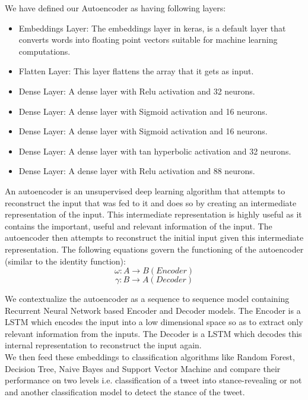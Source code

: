 \documentclass[a4paper,11pt]{article}
\begin{document}
We have defined our Autoencoder as having following layers:
\begin{itemize}
    \item Embeddings Layer: The embeddings layer in keras, is a default layer that converts words into floating point vectors suitable for machine learning computations.
    \item Flatten Layer: This layer flattens the array that it gets as input.
    \item Dense Layer: A dense layer with Relu activation and 32 neurons.
    \item Dense Layer: A dense layer with Sigmoid activation and 16 neurons.
    \item Dense Layer: A dense layer with Sigmoid activation and 16 neurons.
    \item Dense Layer: A dense layer with tan hyperbolic activation and 32 neurons.
    \item Dense Layer: A dense layer with Relu activation and 88 neurons.
\end{itemize}


An autoencoder is an unsupervised deep learning algorithm that attempts to reconstruct the input that was fed to it and does so by creating an intermediate representation of the input. This intermediate representation is highly useful as it contains the important, useful and relevant information of the input. The autoencoder then attempts to reconstruct the initial input given this intermediate representation. The following equations govern the functioning of the autoencoder (similar to the identity function):
\begin{equation}
     \omega: A \to B (Encoder)
 \end{equation}
 \begin{equation}
     \gamma: B \to A (Decoder)
 \end{equation}

We contextualize the autoencoder as a sequence to sequence model containing Recurrent Neural Network based Encoder and Decoder models. The Encoder is a LSTM which encodes the input into a low dimensional space so as to extract only relevant information from the inputs. The Decoder is a LSTM which decodes this internal representation to reconstruct the input again.
\\
We then feed these embeddings to classification algorithms like Random Forest, Decision Tree, Naive Bayes and Support Vector Machine and compare their performance on two levels i.e. classification of a tweet into stance-revealing or not and another classification model to detect the stance of the tweet.
\newpage
\end{document}
